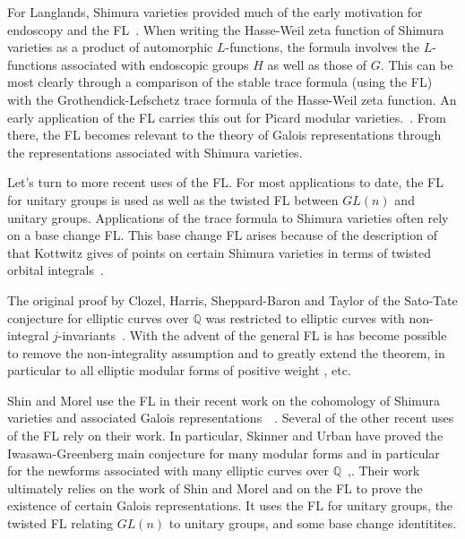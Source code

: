 \documentclass[brochure,english,12pt]{bourbaki}
\newcommand{\ring}[1]{\mathbb{#1}}
\begin{document}
For Langlands, Shimura varieties provided much of the early motivation
for endoscopy and the FL~\cite{LZ:1979}.  When writing the 
Hasse-Weil zeta function of Shimura varieties as a product of
automorphic $L$-functions, the formula involves the $L$-functions
associated with endoscopic groups $H$ as well as those of $G$.  This
can be most clearly through a comparison of the stable trace formula (using the FL)
with the Grothendick-Lefschetz trace formula of the Hasse-Weil zeta
function.
An early application of the FL carries this out for
Picard modular
varieties.~\cite{LPicard:1992}.  From there, the FL becomes relevant to the theory of Galois representations
through the representations associated with Shimura varieties.

Let's turn to more recent uses of the FL.  
For most applications to
date, the FL for unitary groups is used as well as the twisted FL
between $GL(n)$ and unitary groups.  Applications of the trace formula
to Shimura varieties often rely on a base change FL.  This base change FL arises
because of the description of that Kottwitz gives of points on certain
Shimura varieties in terms of twisted orbital
integrals~\cite{Kott:1990}.


The original proof by Clozel, Harris, Sheppard-Baron and Taylor
of the Sato-Tate conjecture for elliptic curves over
$\ring{Q}$ was restricted to elliptic curves with non-integral
$j$-invariants~\cite{Car:Bourbaki}.
With the advent of the general FL is has become possible to remove
the non-integrality assumption and to greatly extend the theorem, in particular 
to all elliptic modular forms of positive weight \cite{BGHT:2010}, etc.




Shin and Morel use the FL in their recent work on the cohomology of
Shimura varieties and associated Galois
representations~\cite{Shin:2010}~\cite{Morel:2010}.  Several of the
other recent uses of the FL rely on their work.  In particular,
Skinner and Urban have proved the Iwasawa-Greenberg main conjecture
for many modular forms and in particular for the newforms associated
with many elliptic curves over
$\ring{Q}$~\cite{Skinner-Urban:2010},\cite{Skinner:2010}.  Their work
ultimately relies on the work of Shin and Morel and on the FL to prove
the existence of certain Galois representations.  It uses the FL for
unitary groups, the twisted FL relating $GL(n)$ to unitary groups, and
some base change identitites.
\end{document}
